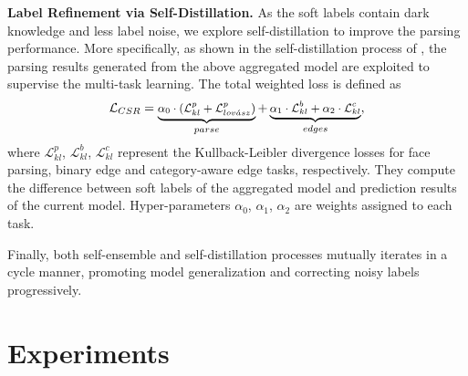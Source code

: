 \documentclass[10pt,twocolumn,letterpaper]{article}
\begin{document}
\noindent\textbf{Label Refinement via Self-Distillation.} 
As the soft labels contain dark knowledge \cite{Hinton2015DistillingTK} and less label noise, we explore self-distillation to improve the parsing performance. More specifically, as shown in the self-distillation process of \figureautorefname{ \ref{fig:framwork}}, the parsing results generated from the above aggregated model are exploited to supervise the multi-task learning. The total weighted loss is defined as  
\begin{equation}
\small
\mathcal{L}_{CSR} = \underbrace{\alpha_{0} \cdot (\mathcal{L}^p_{kl} + \mathcal{L}^p_{lov\acute{a}sz})}_{parse} +  \underbrace{\alpha_{1} \cdot \mathcal{L}_{kl}^{b} + \alpha_{2} \cdot \mathcal{L}_{kl}^{c}}_{edges},
\end{equation} 
where $\mathcal{L}_{kl}^p$, $\mathcal{L}_{kl}^{b}$, $\mathcal{L}_{kl}^{c}$ represent the Kullback-Leibler divergence losses \cite{bce} for face parsing, binary edge and category-aware edge tasks, respectively. They compute the difference between soft labels of the aggregated model and prediction results of the current model. Hyper-parameters $\alpha_{0}$, $\alpha_{1}$, $\alpha_{2}$ are weights assigned to each task.

Finally, both self-ensemble and self-distillation processes mutually iterates in a cycle manner, promoting model generalization and correcting noisy labels progressively.


\section{Experiments}
\end{document}
